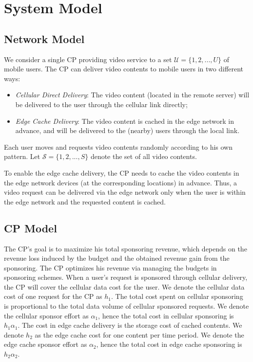 
\section{System Model}

\subsection{Network Model}
We consider a single CP providing video service to a set $\mathcal{U} = \{1,2,...,U\}$ of mobile users. The CP can deliver video contents to mobile users in two different ways:
\begin{itemize}
  \item \emph{Cellular Direct Delivery}: The video content (located in the remote server) will be delivered to the user through the cellular link directly;
  \item \emph{Edge Cache Delivery}: The video content is cached in the edge network in advance, and will be delivered to the (nearby) users through the local link.
\end{itemize}
Each user moves and requests video contents randomly according to his own pattern. Let $\mathcal{S} = \{1,2,...,S\}$ denote the set of all video contents.

To enable the edge cache delivery, the CP needs to cache the video contents in the edge network devices (at the corresponding locations) in advance. Thus, a video request can be delivered via the edge network only when the user is within the edge network and the requested content is cached.

\subsection{CP Model}\label{sec:cpmodel}
The CP's goal is to maximize his total sponsoring revenue, which depends on the revenue loss induced by the budget and the obtained revenue gain from the sponsoring. The CP optimizes his revenue via managing the budgets in sponsoring schemes. When a user's request is sponsored through cellular delivery, the CP will cover the cellular data cost for the user. We denote the cellular data cost of one request for the CP as $h_1$. The total cost spent on cellular sponsoring is proportional to the total data volume of cellular sponsored requests. We denote the cellular sponsor effort as $\alpha_1$, hence the total cost in cellular sponsoring is $h_1 \alpha_1$. The cost in edge cache delivery is the storage cost of cached contents. We denote $h_2$ as the edge cache cost for one content per time period. We denote the edge cache sponsor effort as $\alpha_2$, hence the total cost in edge cache sponsoring is $h_2 \alpha_2$.

